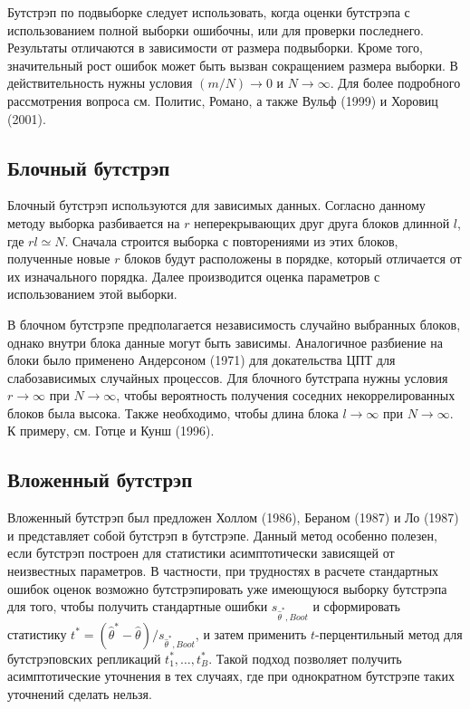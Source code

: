 Бутстрэп по подвыборке следует использовать, когда оценки бутстрэпа с использованием полной выборки ошибочны, или для проверки последнего. Результаты отличаются в зависимости от размера подвыборки. Кроме того, значительный рост ошибок может быть вызван сокращением размера выборки. В действительность нужны условия $(m/N) \rightarrow 0$ и $N{\rightarrow}\infty$. Для более подробного рассмотрения вопроса см. Политис, Романо, а также Вульф (1999) и Хоровиц (2001).

\subsection{Блочный бутстрэп}

Блочный бутстрэп используются для зависимых данных. Согласно данному методу выборка разбивается на $r$ неперекрывающих друг друга блоков длинной $l$, где $rl \simeq N$. Сначала  строится выборка с повторениями из этих блоков, полученные новые $r$ блоков будут расположены в порядке, который отличается от их изначального порядка. Далее производится оценка параметров с использованием  этой выборки. 

В блочном бутстрэпе  предполагается независимость случайно выбранных блоков, однако внутри блока данные могут быть зависимы. Аналогичное разбиение на блоки  было применено Андерсоном (1971) для докательства ЦПТ для слабозависимых случайных процессов. Для блочного бутстрапа нужны условия $r \rightarrow \infty$ при $N \rightarrow \infty$, чтобы вероятность получения соседних некоррелированных блоков была высока. Также необходимо, чтобы длина блока $l \rightarrow \infty$ при $N \rightarrow \infty$. К примеру, см. Готце и Кунш (1996).

\subsection{Вложенный бутстрэп}

Вложенный бутстрэп был предложен Холлом (1986), Бераном (1987) и Ло (1987) и  представляет собой бутстрэп в бутстрэпе. Данный метод особенно полезен, если бутстрэп построен для статистики асимптотически зависящей от неизвестных параметров.   В частности, при трудностях в расчете стандартных ошибок оценок возможно бутстрэпировать уже имеющуюся выборку бутстрэпа для того, чтобы получить стандартные ошибки $s_{\hat{\theta}^*,Boot}$ и сформировать статистику $t^*=(\hat{\theta}^*-\hat{\theta})/s_{\hat{\theta}^*,Boot}$, и затем применить  $t$-перцентильный метод для бутстрэповских репликаций  $t_1^*,\ldots ,t_B^*$. Такой подход позволяет получить асимптотические уточнения в тех случаях, где при однократном бутстрэпе таких уточнений сделать нельзя.


